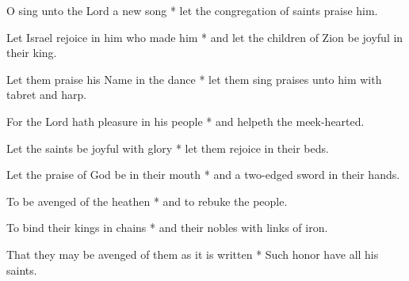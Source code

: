O sing unto the Lord a new song * let the congregation of saints praise him.

Let Israel rejoice in him who made him * and let the children of Zion be joyful in their king.

Let them praise his Name in the dance * let them sing praises unto him with tabret and harp.

For the Lord hath pleasure in his people * and helpeth the meek-hearted.

Let the saints be joyful with glory * let them rejoice in their beds.

Let the praise of God be in their mouth * and a two-edged sword in their hands.

To be avenged of the heathen * and to rebuke the people.

To bind their kings in chains * and their nobles with links of iron.

That they may be avenged of them as it is written * Such honor have all his saints.